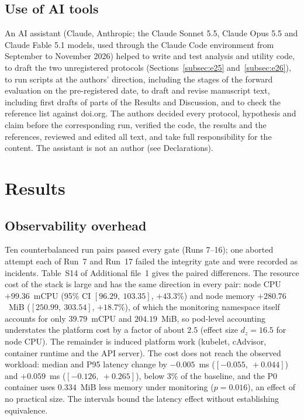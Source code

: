\documentclass[referee,lineno,pdflatex,sn-basic]{sn-jnl}%
\theoremstyle{thmstyleone}%
\theoremstyle{thmstyletwo}%
\theoremstyle{thmstylethree}%
\begin{document}
\subsection*{Use of AI tools}
An AI assistant (Claude, Anthropic; the Claude Sonnet 5.5, Claude Opus 5.5 and Claude Fable 5.1 models, used through the Claude Code environment from September to November 2026) helped to write and test analysis and utility code, to draft the two unregistered protocols (Sections~\ref{subsec:e25} and~\ref{subsec:e26}), to run scripts at the authors' direction, including the stages of the forward evaluation on the pre-registered date, to draft and revise manuscript text, including first drafts of parts of the Results and Discussion, and to check the reference list against doi.org. The authors decided every protocol, hypothesis and claim before the corresponding run, verified the code, the results and the references, reviewed and edited all text, and take full responsibility for the content. The assistant is not an author (see Declarations).

\section{Results}\label{sec4}

\subsection{Observability overhead}
\label{subsec4.1}

Ten counterbalanced run pairs passed every gate (Runs 7--16); one aborted attempt each of Run~7 and Run~17 failed the integrity gate and were recorded as incidents. Table~S14 of Additional file~1 gives the paired differences. The resource cost of the stack is large and has the same direction in every pair: node CPU $+99.36$~mCPU (95\% CI $[96.29,\ 103.35]$, $+43.3\%$) and node memory $+280.76$~MiB ($[250.99,\ 303.54]$, $+18.7\%$), of which the monitoring namespace itself accounts for only $39.79$~mCPU and $204.19$~MiB, so pod-level accounting understates the platform cost by a factor of about $2.5$ (effect size $d_z = 16.5$ for node CPU). The remainder is induced platform work (kubelet, cAdvisor, container runtime and the API server). The cost does not reach the observed workload: median and P95 latency change by $-0.005$~ms ($[-0.055,\ +0.044]$) and $+0.059$~ms ($[-0.126,\ +0.265]$), below $3\%$ of the baseline, and the P0 container uses $0.334$~MiB less memory under monitoring ($p = 0.016$), an effect of no practical size. The intervals bound the latency effect without establishing equivalence.
\end{document}

